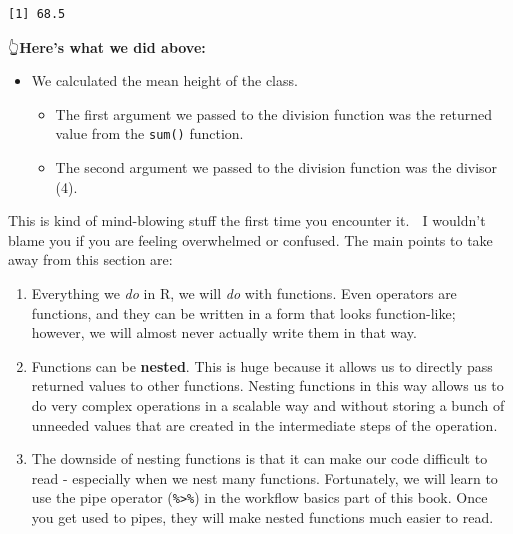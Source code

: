 \documentclass[
  letterpaper,
  DIV=11,
  numbers=noendperiod]{scrreprt}
\newenvironment{Shaded}{\begin{snugshade}}{\end{snugshade}}
\newcommand{\AttributeTok}[1]{\textcolor[rgb]{0.40,0.45,0.13}{#1}}
\newcommand{\DecValTok}[1]{\textcolor[rgb]{0.68,0.00,0.00}{#1}}
\newcommand{\FunctionTok}[1]{\textcolor[rgb]{0.28,0.35,0.67}{#1}}
\newcommand{\NormalTok}[1]{\textcolor[rgb]{0.00,0.23,0.31}{#1}}
\newcommand{\SpecialCharTok}[1]{\textcolor[rgb]{0.37,0.37,0.37}{#1}}
\newcommand{\StringTok}[1]{\textcolor[rgb]{0.13,0.47,0.30}{#1}}
\begin{document}
\begin{Shaded}
\end{Shaded}

\begin{verbatim}
[1] 68.5
\end{verbatim}

👆\textbf{Here's what we did above:}

\begin{itemize}
\item
  We calculated the mean height of the class.

  \begin{itemize}
  \item
    The first argument we passed to the division function was the
    returned value from the \texttt{sum()} function.
  \item
    The second argument we passed to the division function was the
    divisor (4).
  \end{itemize}
\end{itemize}

This is kind of mind-blowing stuff the first time you encounter it. 🤯 I
wouldn't blame you if you are feeling overwhelmed or confused. The main
points to take away from this section are:

\begin{enumerate}
\def\labelenumi{\arabic{enumi}.}
\item
  Everything we \emph{do} in R, we will \emph{do} with functions. Even
  operators are functions, and they can be written in a form that looks
  function-like; however, we will almost never actually write them in
  that way.
\item
  Functions can be \textbf{nested}. This is huge because it allows us to
  directly pass returned values to other functions. Nesting functions in
  this way allows us to do very complex operations in a scalable way and
  without storing a bunch of unneeded values that are created in the
  intermediate steps of the operation.
\item
  The downside of nesting functions is that it can make our code
  difficult to read - especially when we nest many functions.
  Fortunately, we will learn to use the pipe operator
  (\texttt{\%\textgreater{}\%}) in the workflow basics part of this
  book. Once you get used to pipes, they will make nested functions much
  easier to read.
\end{enumerate}
\end{document}
